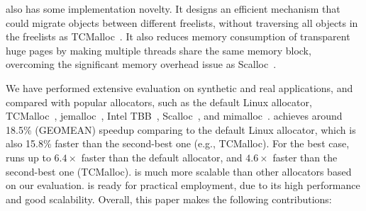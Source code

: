  
\NM{} also has some implementation novelty. 
It designs an efficient mechanism that could migrate objects between different freelists, without traversing all objects in the freelists as TCMalloc~\cite{tcmalloc}. 
It also reduces memory consumption of transparent huge pages by making multiple threads share the same memory block, overcoming the significant memory overhead issue as Scalloc~\cite{Scalloc}. 

We have performed extensive evaluation on synthetic and real applications, and compared \NM{} with popular allocators, such as the default Linux allocator, TCMalloc~\cite{tcmalloc}, jemalloc~\cite{jemalloc}, Intel TBB~\cite{tbb}, Scalloc~\cite{Scalloc}, and mimalloc~\cite{mimalloc}. \NM{} achieves around 18.5\%  (GEOMEAN) speedup comparing to the default Linux allocator, which is also 15.8\% faster than the second-best one (e.g., TCMalloc). For the best case, \NM{} runs up to $6.4\times$ faster than the default allocator, and $4.6\times$ faster than the second-best one (TCMalloc). \NM{} is much more scalable than other allocators based on our evaluation. \NM{} is ready for practical employment, due to its high performance and good scalability. Overall, this paper makes the following contributions:

